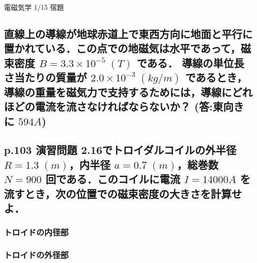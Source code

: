 \documentclass[a4paper, 12pt]{bxjsarticle}
\begin{document}
\begin{center}
    \begin{huge}
        電磁気学 1/15 宿題
    \end{huge}
\end{center}

\begin{samepage}
    \subsection{直線上の導線が地球赤道上で東西方向に地面と平行に置かれている．この点での地磁気は水平であって，磁束密度 \(B = 3.3\times10^{-5}\;(\si{T})\) である．%
導線の単位長さ当たりの質量が \(2.0\times10^{-3}\;(\si{kg/m})\) であるとき，導線の重量を磁気力で支持するためには，導線にどれほどの電流を流さなければならないか？%
(答:東向きに \(594\si{A}\))}
\vspace*{10em}

    \subsection{p.103 演習問題 2.16でトロイダルコイルの外半径 \(R =1.3\;\si{(m)}\)，内半径 \(a = 0.7\;\si{(m)}\)，総巻数 \(N=900\) 回である．このコイルに電流 \(I=14000\si{A}\) を%
流すとき，次の位置での磁束密度の大きさを計算せよ．}

\subsubsection{トロイドの内径部}

    \vspace*{10em}

\subsubsection{トロイドの外径部}

\end{samepage}
\newpage
\end{document}

